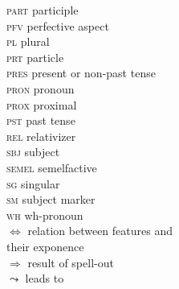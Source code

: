 \begin{multicols}{2}
\begin{tabbing}
\textsc{part}		\>	participle\\
\textsc{pfv}		\>	perfective aspect\\
\textsc{pl}			\>	plural\\
\textsc{prt}		\>	particle\\
\textsc{pres}		\>	present or non-past tense\\
\textsc{pron}		\>	pronoun\\
\textsc{prox}		\>	proximal\\
\textsc{pst}		\>	past tense\\
\textsc{rel}		\>	relativizer\\
\textsc{sbj}		\>	subject\\
\textsc{semel}		\>	semelfactive\\
\textsc{sg}		    \>	singular\\
\textsc{sm}		    \>	subject marker\\
\textsc{wh}		    \>	wh-pronoun\\
$\Leftrightarrow$	\>	relation between features and\\ \> their exponence\\
$\Rightarrow$       \>    	result of spell-out \\
$\leadsto$        	\>    	leads to \\
\end{tabbing}\end{multicols} 
